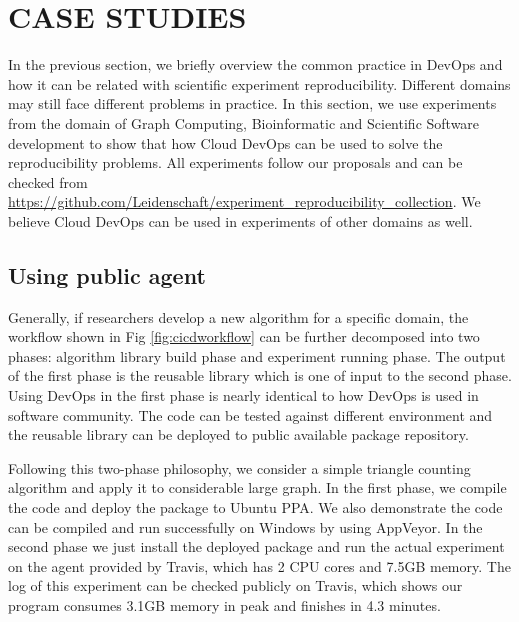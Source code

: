 \documentclass[10pt, conference, compsocconf]{IEEEtran}
\begin{document}
\section{CASE STUDIES}
In the previous section, we briefly overview the common practice in DevOps and how it can be related with scientific experiment reproducibility. Different domains may still face different problems in practice. In this section, we use experiments from the domain of Graph Computing, Bioinformatic and Scientific Software development to show that how Cloud DevOps can be used to solve the reproducibility problems. All experiments follow our proposals and can be checked from \url{https://github.com/Leidenschaft/experiment_reproducibility_collection}. We believe Cloud DevOps can be used in experiments of other domains as well. 

\subsection{Using public agent}
Generally, if researchers develop a new algorithm for a specific domain, the workflow shown in Fig \ref{fig:cicdworkflow} can be further decomposed into two phases:
algorithm library build phase and experiment running phase. The output of the first phase is the reusable library which is one of input to the second phase. Using DevOps in the first phase is nearly identical to how DevOps is used in software community.  The code can be tested against different environment and 
the reusable library can be deployed to public available package repository.
 
Following this two-phase philosophy, we consider a simple triangle counting algorithm and apply it to considerable large graph. %
In the first phase, we compile the code and deploy the package to Ubuntu PPA. We also demonstrate the code can be compiled and run successfully on Windows by using AppVeyor. In the second phase we just install the deployed package and run the actual experiment on the agent provided by Travis, which has 2 CPU cores and 7.5GB memory. The log of this experiment can be checked publicly on Travis, which shows
our program consumes 3.1GB memory in peak and finishes in 4.3 minutes. 
\end{document}
